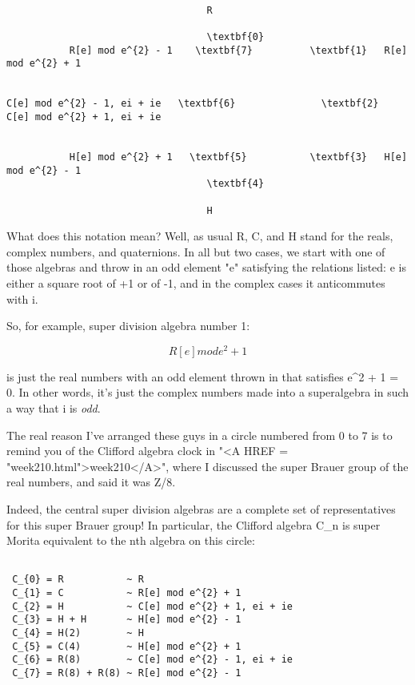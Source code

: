 \begin{verbatim}

                                   R

                                   \textbf{0}
           R[e] mod e^{2} - 1    \textbf{7}          \textbf{1}   R[e] mod e^{2} + 1
 

C[e] mod e^{2} - 1, ei + ie   \textbf{6}               \textbf{2}   C[e] mod e^{2} + 1, ei + ie
 

           H[e] mod e^{2} + 1   \textbf{5}           \textbf{3}   H[e] mod e^{2} - 1
                                   \textbf{4}
 
                                   H

\end{verbatim}
    
What does this notation mean?  Well, as usual R, C, and H stand for 
the reals, complex numbers, and quaternions.  In all but two cases,
we start with one of those algebras and throw in an odd element "e"
satisfying the relations listed: e is either a square root of +1 or
of -1, and in the complex cases it anticommutes with i.  

So, for example, super division algebra number 1:


$$

R[e] mod e^{2} + 1
$$
    
is just the real numbers with an odd element thrown in that satisfies
e^{2} + 1 = 0.  In other words, it's just the complex numbers made into
a superalgebra in such a way that i is \emph{odd}.

The real reason I've arranged these guys in a circle numbered from 
0 to 7 is to remind you of the Clifford algebra 
clock in "<A HREF = "week210.html">week210</A>",
where I discussed the super Brauer group of the real numbers, and
said it was Z/8.  

Indeed, the central super division algebras are a complete set of 
representatives for this super Brauer group!  In particular, the 
Clifford algebra C_{n} is super Morita equivalent to the nth algebra 
on this circle:


\begin{verbatim}

 C_{0} = R           ~ R
 C_{1} = C           ~ R[e] mod e^{2} + 1
 C_{2} = H           ~ C[e] mod e^{2} + 1, ei + ie
 C_{3} = H + H       ~ H[e] mod e^{2} - 1
 C_{4} = H(2)        ~ H
 C_{5} = C(4)        ~ H[e] mod e^{2} + 1
 C_{6} = R(8)        ~ C[e] mod e^{2} - 1, ei + ie
 C_{7} = R(8) + R(8) ~ R[e] mod e^{2} - 1
\end{verbatim}
    
